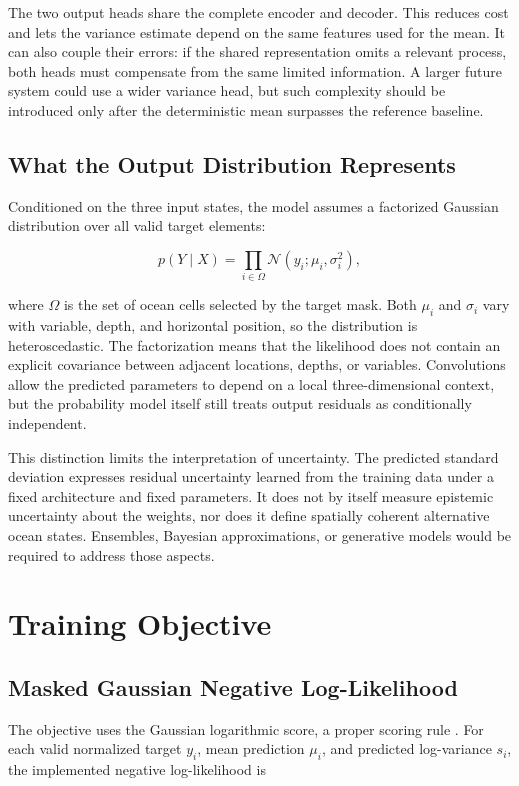 The two output heads share the complete encoder and decoder. This reduces cost and lets the variance estimate depend on the same features used for the mean. It can also couple their errors: if the shared representation omits a relevant process, both heads must compensate from the same limited information. A larger future system could use a wider variance head, but such complexity should be introduced only after the deterministic mean surpasses the reference baseline.

\subsection{What the Output Distribution Represents}

Conditioned on the three input states, the model assumes a factorized Gaussian distribution over all valid target elements:

\[
p(Y\mid X)=\prod_{i\in\Omega}
\mathcal{N}(y_i;\mu_i,\sigma_i^2),
\]

where $\Omega$ is the set of ocean cells selected by the target mask. Both $\mu_i$ and $\sigma_i$ vary with variable, depth, and horizontal position, so the distribution is heteroscedastic. The factorization means that the likelihood does not contain an explicit covariance between adjacent locations, depths, or variables. Convolutions allow the predicted parameters to depend on a local three-dimensional context, but the probability model itself still treats output residuals as conditionally independent.

This distinction limits the interpretation of uncertainty. The predicted standard deviation expresses residual uncertainty learned from the training data under a fixed architecture and fixed parameters. It does not by itself measure epistemic uncertainty about the weights, nor does it define spatially coherent alternative ocean states. Ensembles, Bayesian approximations, or generative models would be required to address those aspects.

\section{Training Objective}

\subsection{Masked Gaussian Negative Log-Likelihood}

The objective uses the Gaussian logarithmic score, a proper scoring rule \citep{gneiting2007scoring}. For each valid normalized target $y_i$, mean prediction $\mu_i$, and predicted log-variance $s_i$, the implemented negative log-likelihood is

